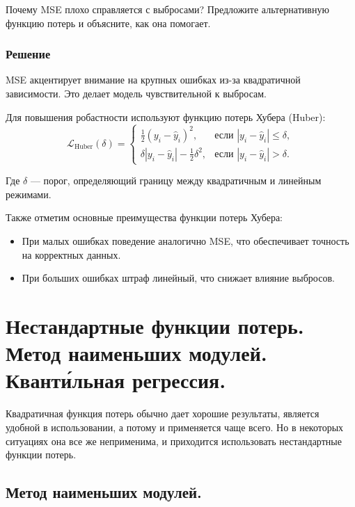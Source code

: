 Почему MSE плохо справляется с выбросами? Предложите альтернативную функцию потерь и объясните, как она помогает.

\subsubsection*{Решение}

MSE акцентирует внимание на крупных ошибках из-за квадратичной зависимости. Это делает модель чувствительной к выбросам.

Для повышения робастности используют функцию потерь Хубера (Huber):
\[
    \mathcal{L}_{\text{Huber}}(\delta) = \begin{cases}
        \frac{1}{2}(y_i - \hat{y}_i)^2,                 & \text{если } |y_i - \hat{y}_i| \leq \delta, \\
        \delta |y_i - \hat{y}_i| - \frac{1}{2}\delta^2, & \text{если } |y_i - \hat{y}_i| > \delta.
    \end{cases}
\]

Где $\delta$ — порог, определяющий границу между квадратичным и линейным режимами.

Также отметим основные преимущества функции потерь Хубера:
\begin{itemize}
    \item При малых ошибках поведение аналогично MSE, что обеспечивает точность на корректных данных.
    \item При больших ошибках штраф линейный, что снижает влияние выбросов.
\end{itemize}










\section*{Нестандартные функции потерь. Метод наименьших модулей. Квант\'{и}льная регрессия.}

Квадратичная функция потерь обычно дает хорошие результаты, является удобной в использовании, а потому и применяется чаще всего. Но в некоторых ситуациях она все же неприменима, и приходится использовать нестандартные функции потерь.

\subsection*{Метод наименьших модулей.}

